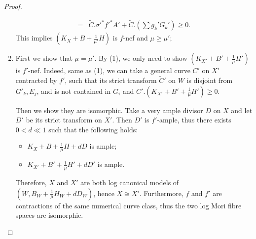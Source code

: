 \documentclass[11pt]{amsart}
\begin{document}
\begin{proof}
\begin{enumerate}
\[\begin{aligned}
              =                                     & \tilde{C}.\sigma'^*f'^*A'+\tilde{C}.\left(\sum g_k'G_k'\right) \geqslant0 .
            \end{aligned}
          \]
          This implies $ (K_X+B+\frac{1}{\mu'}H) $ is $ f $-nef and $ \mu\geqslant \mu' $;
    \item First we show that $ \mu=\mu' $. By (1), we only need to show $ (K_{X'}+B'+\frac{1}{\mu}H') $ is $ f' $-nef. Indeed,  same as (1), we can take a general curve $ C' $ on $X'$ contracted by $f'$, such that its strict transform $\tilde{C}'$ on $W$ is disjoint from  $ G'_k, E_j $, and is not contained in $ G_i $ and $C'.\left(K_{X'}+B'+\frac{1}{\mu}H'\right)\geqslant 0$.

          Then we show they are isomorphic. Take a very ample divisor $ D $ on $ X $ and let $ D'  $ be its strict transform on $ X' $. Then $ D' $ is $ f' $-ample, thus there exists $ 0<d\ll1 $ such that the following holds:
          \begin{itemize}
            \item $ K_X+B+\frac{1}{\mu }H+dD $ is ample;
            \item $ K_{X'}+B'+\frac{1}{\mu }H'+dD' $ is ample.
          \end{itemize}
          Therefore, $X$ and $X'$ are both log canonical models of $(W,B_{W}+\frac{1}{\mu}H_{W}+dD_{W})$, hence $X\cong X'$. Furthermore, $f$ and  $f'$ are contractions of the same numerical curve class, thus the two log Mori fibre spaces are isomorphic.
  \end{enumerate}
\end{proof}
\end{document}
